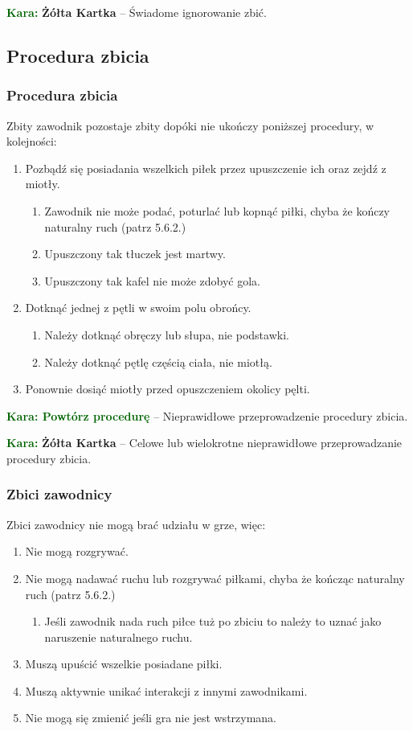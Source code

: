 \documentclass[11pt,a4paper]{article}
\newcommand\yellowcard[1]{\bgroup\textcolor{darkgreen}{\textbf{Kara: }}\bgroup\textcolor{darkyellow}{\textbf{Żółta Kartka}} -- #1}
\newcommand\penaltyd[2]{\bgroup\textcolor{darkgreen}{\textbf{Kara: #1}} -- #2}
\begin{document}
\yellowcard{Świadome ignorowanie zbić.}

\subsection{Procedura zbicia}

\subsubsection{Procedura zbicia}
Zbity zawodnik pozostaje zbity dopóki nie ukończy poniższej procedury, w kolejności:
\begin{enumerate}
  \item Pozbądź się posiadania wszelkich piłek przez upuszczenie ich oraz zejdź z miotły.
  \begin{enumerate}
    \item Zawodnik nie może podać, poturlać lub kopnąć piłki, chyba że kończy naturalny ruch (patrz 5.6.2.) %
    \item Upuszczony tak tłuczek jest martwy.
    \item Upuszczony tak kafel nie może zdobyć gola.
  \end{enumerate}
  \item Dotknąć jednej z pętli w swoim polu obrońcy.
  \begin{enumerate}
    \item Należy dotknąć obręczy lub słupa, nie podstawki.
    \item Należy dotknąć pętlę częścią ciała, nie miotłą.
  \end{enumerate}
  \item Ponownie dosiąć miotły przed opuszczeniem okolicy pęlti.
\end{enumerate}

\penaltyd{Powtórz procedurę}{Nieprawidłowe przeprowadzenie procedury zbicia.}

\yellowcard{Celowe lub wielokrotne nieprawidłowe przeprowadzanie procedury zbicia.}

\subsubsection{Zbici zawodnicy}
Zbici zawodnicy nie mogą brać udziału w grze, więc:
\begin{enumerate}
  \item Nie mogą rozgrywać.
  \item Nie mogą nadawać ruchu lub rozgrywać piłkami, chyba że kończąc naturalny ruch (patrz 5.6.2.) %
  \begin{enumerate}
    \item Jeśli zawodnik nada ruch piłce tuż po zbiciu to należy to uznać jako naruszenie naturalnego ruchu.
  \end{enumerate}
  \item Muszą upuścić wszelkie posiadane piłki.
  \item Muszą aktywnie unikać interakcji z innymi zawodnikami.
  \item Nie mogą się zmienić jeśli gra nie jest wstrzymana.
\end{enumerate}
\end{document}
